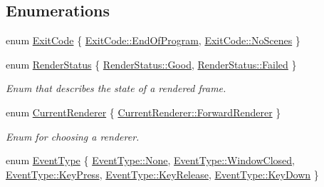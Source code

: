 \subsection*{Enumerations}
\begin{DoxyCompactItemize}
\item 
enum \hyperlink{namespacepcs_a18473e98e91ab823330de05ab508a5bb}{Exit\+Code} \{ \hyperlink{namespacepcs_a18473e98e91ab823330de05ab508a5bba83a7a1ef57838501fbf6c362184cf38c}{Exit\+Code\+::\+End\+Of\+Program}, 
\hyperlink{namespacepcs_a18473e98e91ab823330de05ab508a5bba8c553e1073c5a910fc146f2ec6fd9487}{Exit\+Code\+::\+No\+Scenes}
 \}
\item 
enum \hyperlink{namespacepcs_a979c2971659f1655c7ebe27752b8a9a0}{Render\+Status} \{ \hyperlink{namespacepcs_a979c2971659f1655c7ebe27752b8a9a0a0c6ad70beb3a7e76c3fc7adab7c46acc}{Render\+Status\+::\+Good}, 
\hyperlink{namespacepcs_a979c2971659f1655c7ebe27752b8a9a0ad7c8c85bf79bbe1b7188497c32c3b0ca}{Render\+Status\+::\+Failed}
 \}\begin{DoxyCompactList}\small\item\em Enum that describes the state of a rendered frame. \end{DoxyCompactList}
\item 
enum \hyperlink{namespacepcs_ad2936e1e1cc9e4a344e2e90394d38ea2}{Current\+Renderer} \{ \hyperlink{namespacepcs_ad2936e1e1cc9e4a344e2e90394d38ea2a543c5aedcd290482b39d826c65f358ff}{Current\+Renderer\+::\+Forward\+Renderer}
 \}\begin{DoxyCompactList}\small\item\em Enum for choosing a renderer. \end{DoxyCompactList}
\item 
enum \hyperlink{namespacepcs_a12954f53e3d7d6a8765fd723e1ce8db4}{Event\+Type} \{ \newline
\hyperlink{namespacepcs_a12954f53e3d7d6a8765fd723e1ce8db4a6adf97f83acf6453d4a6a4b1070f3754}{Event\+Type\+::\+None}, 
\hyperlink{namespacepcs_a12954f53e3d7d6a8765fd723e1ce8db4a7c87dff2b968b5c85baf1def063c776d}{Event\+Type\+::\+Window\+Closed}, 
\hyperlink{namespacepcs_a12954f53e3d7d6a8765fd723e1ce8db4a65a1aa093fcf3acd50b318f1942c02f5}{Event\+Type\+::\+Key\+Press}, 
\hyperlink{namespacepcs_a12954f53e3d7d6a8765fd723e1ce8db4a17ee17cec34ff017c382ba1ce8dc4cdc}{Event\+Type\+::\+Key\+Release}, 
\newline
\hyperlink{namespacepcs_a12954f53e3d7d6a8765fd723e1ce8db4acfd07bf1effd88bca04a12a087777354}{Event\+Type\+::\+Key\+Down}
 \}
\item 

\end{DoxyCompactItemize}

